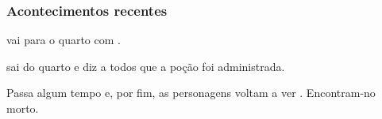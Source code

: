 \subsubsection{Acontecimentos recentes}

 vai para o quarto com .

 sai do quarto e diz a todos que a poção foi administrada.

Passa algum tempo e, por fim, as personagens voltam a ver . Encontram-no morto.
